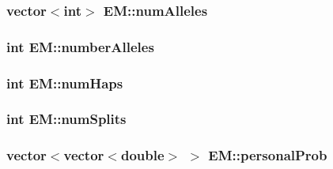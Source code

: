 \label{classEM_a0a7a49feeff6a6ce2908bd626c876a60}
\hypertarget{classEM_a8355d01f8998e654c32b1fc8f478ced1}{
\subsubsection[{numAlleles}]{\setlength{\rightskip}{0pt plus 5cm}vector$<$int$>$ {\bf EM::numAlleles}}}
\label{classEM_a8355d01f8998e654c32b1fc8f478ced1}
\hypertarget{classEM_ae8420599f2bb0359bec3f8640699aa43}{
\subsubsection[{numberAlleles}]{\setlength{\rightskip}{0pt plus 5cm}int {\bf EM::numberAlleles}}}
\label{classEM_ae8420599f2bb0359bec3f8640699aa43}
\hypertarget{classEM_a6fb53f57dafe2497417ae7b55748a2f5}{
\subsubsection[{numHaps}]{\setlength{\rightskip}{0pt plus 5cm}int {\bf EM::numHaps}}}
\label{classEM_a6fb53f57dafe2497417ae7b55748a2f5}
\hypertarget{classEM_af93ac6cc803cd05ab2a266e77b864ae1}{
\subsubsection[{numSplits}]{\setlength{\rightskip}{0pt plus 5cm}int {\bf EM::numSplits}}}
\label{classEM_af93ac6cc803cd05ab2a266e77b864ae1}
\hypertarget{classEM_abb7e20d53630eb8b692084ba1cf666c5}{
\subsubsection[{personalProb}]{\setlength{\rightskip}{0pt plus 5cm}vector$<$vector$<$double$>$ $>$ {\bf EM::personalProb}}}
